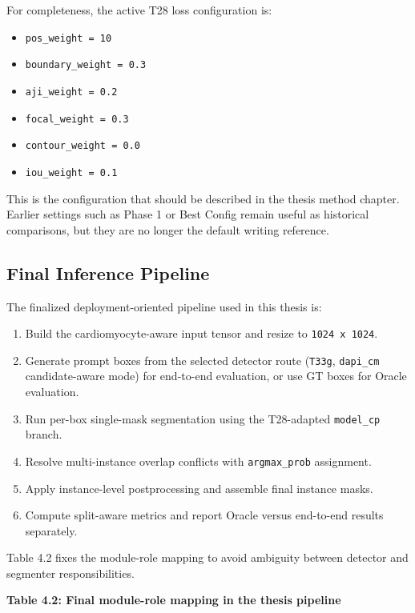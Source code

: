 For completeness, the active T28 loss configuration is:

\begin{itemize}
\tightlist
\item
  \texttt{pos\_weight\ =\ 10}
\item
  \texttt{boundary\_weight\ =\ 0.3}
\item
  \texttt{aji\_weight\ =\ 0.2}
\item
  \texttt{focal\_weight\ =\ 0.3}
\item
  \texttt{contour\_weight\ =\ 0.0}
\item
  \texttt{iou\_weight\ =\ 0.1}
\end{itemize}

This is the configuration that should be described in the thesis method chapter. Earlier settings such as Phase 1 or Best Config remain useful as historical comparisons, but they are no longer the default writing reference.

\subsection{Final Inference Pipeline}\label{final-inference-pipeline}

The finalized deployment-oriented pipeline used in this thesis is:

\begin{enumerate}
\def\labelenumi{\arabic{enumi}.}
\tightlist
\item
  Build the cardiomyocyte-aware input tensor and resize to \texttt{1024\ x\ 1024}.
\item
  Generate prompt boxes from the selected detector route (\texttt{T33g}, \texttt{dapi\_cm} candidate-aware mode) for end-to-end evaluation, or use GT boxes for Oracle evaluation.
\item
  Run per-box single-mask segmentation using the T28-adapted \texttt{model\_cp} branch.
\item
  Resolve multi-instance overlap conflicts with \texttt{argmax\_prob} assignment.
\item
  Apply instance-level postprocessing and assemble final instance masks.
\item
  Compute split-aware metrics and report Oracle versus end-to-end results separately.
\end{enumerate}

Table 4.2 fixes the module-role mapping to avoid ambiguity between detector and segmenter responsibilities.

\textbf{Table 4.2: Final module-role mapping in the thesis pipeline}

